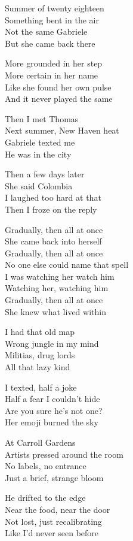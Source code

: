 \begin{lyrics}
Summer of twenty eighteen\\
Something bent in the air\\
Not the same Gabriele\\
But she came back there

More grounded in her step\\
More certain in her name\\
Like she found her own pulse\\
And it never played the same

Then I met Thomas\\
Next summer, New Haven heat\\
Gabriele texted me\\
He was in the city

Then a few days later\\
She said Colombia\\
I laughed too hard at that\\
Then I froze on the reply

Gradually, then all at once\\
She came back into herself\\
Gradually, then all at once\\
No one else could name that spell\\
I was watching her watch him\\
Watching her, watching him\\
Gradually, then all at once\\
She knew what lived within

I had that old map\\
Wrong jungle in my mind\\
Militias, drug lords\\
All that lazy kind

I texted, half a joke\\
Half a fear I couldn’t hide\\
Are you sure he’s not one?\\
Her emoji burned the sky

At Carroll Gardens\\
Artists pressed around the room\\
No labels, no entrance\\
Just a brief, strange bloom

He drifted to the edge\\
Near the food, near the door\\
Not lost, just recalibrating\\
Like I’d never seen before


\end{lyrics}
